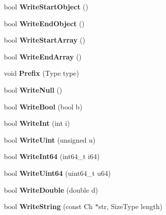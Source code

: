 \begin{DoxyCompactItemize}
bool {\bfseries Write\+Start\+Object} ()
\item 
\mbox{\label{classWriter_a9f76fcffaf403a49a311de074a23de2d}} 
bool {\bfseries Write\+End\+Object} ()
\item 
\mbox{\label{classWriter_af3804bde535cf36e0733c07a56742111}} 
bool {\bfseries Write\+Start\+Array} ()
\item 
\mbox{\label{classWriter_a9d7ec17cfb0b64a88c009871ba741f52}} 
bool {\bfseries Write\+End\+Array} ()
\item 
\mbox{\label{classWriter_ad56f2e953b7919ad2157a2fc2bedf873}} 
void {\bfseries Prefix} (Type type)
\item 
\mbox{\label{classWriter_af4f79d39ad69cbbc7976565dd257b436}} 
bool {\bfseries Write\+Null} ()
\item 
\mbox{\label{classWriter_a21f1adc6a520084ed4f39522ed9f4540}} 
bool {\bfseries Write\+Bool} (bool b)
\item 
\mbox{\label{classWriter_acc42b38b43ae1488fc2e779c8a333d34}} 
bool {\bfseries Write\+Int} (int i)
\item 
\mbox{\label{classWriter_aa7e4196f87bfa66c9619e0efd15d16ea}} 
bool {\bfseries Write\+Uint} (unsigned u)
\item 
\mbox{\label{classWriter_ad68f4e0a85cc944a0740200544c97ed9}} 
bool {\bfseries Write\+Int64} (int64\+\_\+t i64)
\item 
\mbox{\label{classWriter_ac3d17e9409c202e39b0cd887545783d6}} 
bool {\bfseries Write\+Uint64} (uint64\+\_\+t u64)
\item 
\mbox{\label{classWriter_aced9cb2b88abc16c4a0bdb75920cd424}} 
bool {\bfseries Write\+Double} (double d)
\item 
\mbox{\label{classWriter_aab4926d061472149998b89b4d34e1a4b}} 
bool {\bfseries Write\+String} (const Ch $\ast$str, Size\+Type length)
\item 

\end{DoxyCompactItemize}
